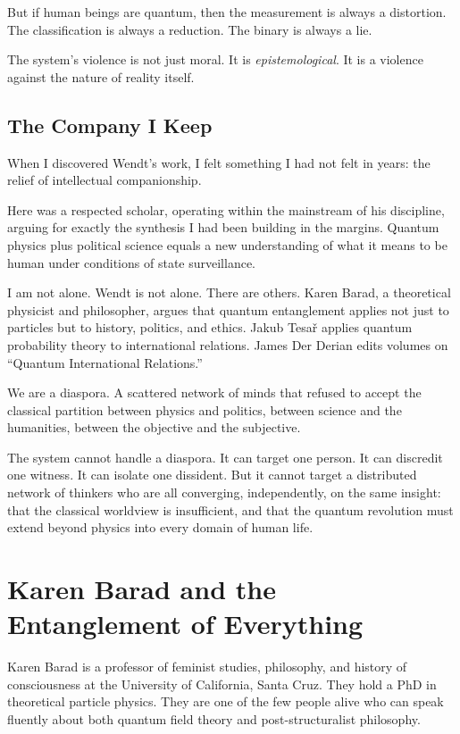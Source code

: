 \documentclass[11pt,openany]{book}
\begin{document}
But if human beings are quantum, then the measurement is always a distortion. The classification is always a reduction. The binary is always a lie.

The system's violence is not just moral. It is \textit{epistemological}. It is a violence against the nature of reality itself.

\section*{The Company I Keep}

When I discovered Wendt's work, I felt something I had not felt in years: the relief of intellectual companionship.

Here was a respected scholar, operating within the mainstream of his discipline, arguing for exactly the synthesis I had been building in the margins. Quantum physics plus political science equals a new understanding of what it means to be human under conditions of state surveillance.

I am not alone. Wendt is not alone. There are others. Karen Barad, a theoretical physicist and philosopher, argues that quantum entanglement applies not just to particles but to history, politics, and ethics. Jakub Tesa\v{r} applies quantum probability theory to international relations. James Der Derian edits volumes on ``Quantum International Relations.'' 

We are a diaspora. A scattered network of minds that refused to accept the classical partition between physics and politics, between science and the humanities, between the objective and the subjective.

The system cannot handle a diaspora. It can target one person. It can discredit one witness. It can isolate one dissident. But it cannot target a distributed network of thinkers who are all converging, independently, on the same insight: that the classical worldview is insufficient, and that the quantum revolution must extend beyond physics into every domain of human life.

\chapter{Karen Barad and the Entanglement of Everything}

Karen Barad is a professor of feminist studies, philosophy, and history of consciousness at the University of California, Santa Cruz. They hold a PhD in theoretical particle physics. They are one of the few people alive who can speak fluently about both quantum field theory and post-structuralist philosophy.
\end{document}
